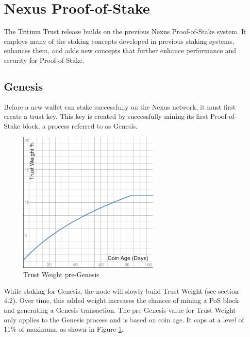 \documentclass[11pt]{article}
\begin{document}
\bigskip

\section{Nexus Proof-of-Stake}
The Tritium Trust release builds on the previous Nexus Proof-of-Stake system. It employs many of the staking concepts developed in previous staking systems, enhances them, and adds new concepts that further enhance performance and security for Proof-of-Stake.\\

\subsection{Genesis}
Before a new wallet can stake successfully on the Nexus network, it must first create a trust key. This key is created by successfully mining its first Proof-of-Stake block, a process referred to as Genesis. \\

\begin{figure}[h!]
    \centering
    \includegraphics[width=0.63\textwidth]{images/preGenesisTrustWeight.png}
    \caption{Trust Weight pre-Genesis \label{fig:preGenesisTrust}}
\end{figure}

\noindent While staking for Genesis, the node will slowly build Trust Weight (see section 4.2). Over time, this added weight increases the chances of mining a PoS block and generating a Genesis transaction. The pre-Genesis value for Trust Weight only applies to the Genesis process and is based on coin age. It caps at a level of 11\% of maximum, as shown in Figure \ref{fig:preGenesisTrust}.\\
\end{document}
